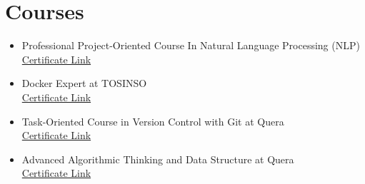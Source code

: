 \documentclass[10pt, letterpaper]{article}
\begin{document}
\section{Courses}
\begin{itemize}[leftmargin=*]
    \item Professional Project-Oriented Course In Natural Language Processing (NLP) \\
    \href{https://quera.org/certificate/wfRPimzH/}{Certificate Link}
    \item Docker Expert at TOSINSO \\
    \href{https://tosinso.com/files/get/f6a4dee5-402f-4b49-9b25-bdc06fb2a464}{Certificate Link}
    \item Task-Oriented Course in Version Control with Git at Quera \\
    \href{https://quera.org/certificate/AMBOBgnQ/}{Certificate Link}
    \item Advanced Algorithmic Thinking and Data Structure at Quera \\
    \href{https://quera.org/certificate/qNltcusF/}{Certificate Link}
\end{itemize}

\end{document}
